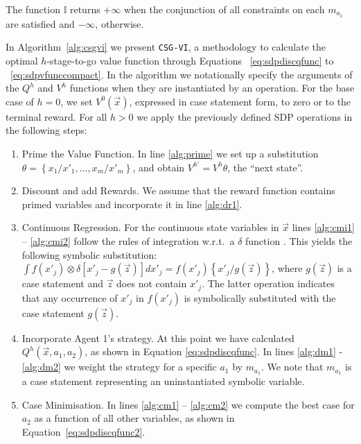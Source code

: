 The function $\mathbb{I}$ returns $+\infty$ when the conjunction of all constraints on each $m_{a_1}$ are satisfied
and $-\infty$, otherwise.

In Algorithm~\ref{alg:csgvi} we present \texttt{CSG-VI}, a methodology to calculate the optimal $h$-stage-to-go value function
through Equations ~\eqref{eq:sdpdiscqfunc} to ~\eqref{eq:sdpvfunccompact}. In the algorithm we notationally specify 
the arguments of the $Q^h$ and $V^h$ functions when they are 
instantiated by an operation. For the base case of $h = 0$, we set {\small $V^0(\vec{x})$}, expressed in 
case statement form, to zero or to the terminal reward. For all $h > 0$
we apply the previously defined SDP operations in the following steps:
\begin{enumerate}
  \item Prime the Value Function. 
            In line \ref{alg:prime} we set up a 
            substitution {\small $\theta = \left\{ x_1/x'_1, \ldots, x_m/x'_m \right\}$}, 
            and obtain {\small $V^{h'} = V^{h}\theta$}, the ``next state''.
  \item Discount and add Rewards. 
            We assume that the reward function contains primed variables and incorporate it in line \ref{alg:dr1}.
  \item Continuous Regression. For the continuous state variables in $\vec{x}$
            lines \ref{alg:cmi1} -- \ref{alg:cmi2} follow the rules of integration w.r.t.~a $\delta$ function 
            \cite{Sanner_UAI_2011}. This yields the following symbolic substitution: 
            {\small $\int f(x'_j) \otimes \delta\left[ x'_j - g(\vec{z})\right] dx'_j = f(x'_j)\left\{ x'_j/g(\vec{z})\right\}$},
            where $g(\vec{z})$ is a case statement and $\vec{z}$ does not contain $x'_j$.
            The latter operation indicates that any occurrence of $x'_j$ in $f(x'_j)$ is symbolically substituted
            with the case statement $g(\vec{z})$.
  \item Incorporate Agent 1's strategy. 
            At this point we have calculated {\small $Q^h(\vec{x}, a_1, a_2)$}, as shown in
            Equation \eqref{eq:sdpdiscqfunc}. In lines \ref{alg:dm1} - \ref{alg:dm2} 
            we weight the strategy for a specific $a_1$ by $m_{a_{1}}$.
            We note that $m_{a_{1}}$ is a case statement representing
            an uninstantiated symbolic variable.
  \item Case Minimisation. 
            In lines \ref{alg:cm1} -- \ref{alg:cm2} we compute the best case for 
            $a_2$ as a function of all other variables, as shown in Equation~\eqref{eq:sdpdiscqfunc2}. 

\end{enumerate}
